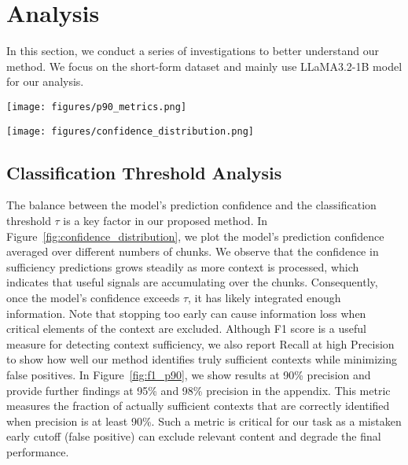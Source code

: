 \section{Analysis}
In this section, we conduct a series of investigations to better understand our method. We focus on the short-form dataset and mainly use LLaMA3.2-1B model for our analysis. 


\noindent\begin{minipage}[t]{0.48\textwidth}
\centering
\vspace{-2mm}
\texttt{[image: figures/p90\_metrics.png]}
\vspace{-2mm}
\vspace{-5em}
\label{fig:f1_p90}
\end{minipage}
\hfill
\begin{minipage}[t]{0.48\textwidth}
\centering

\centering
\vspace{-2mm}
\texttt{[image: figures/confidence\_distribution.png]}
\vspace{-2mm}
\label{fig:confidence_distribution}
\end{minipage}


\subsection{Classification Threshold Analysis}
\label{sec:threshold}
The balance between the model’s prediction confidence and the classification threshold $\tau$ is a key factor in our proposed method. In Figure~\ref{fig:confidence_distribution}, we plot the model’s prediction confidence averaged over different numbers of chunks. We observe that the confidence in sufficiency predictions grows steadily as more context is processed, which indicates that useful signals are accumulating over the chunks. Consequently, once the model’s confidence exceeds $\tau$, it has likely integrated enough information. Note that stopping too early can cause information loss when critical elements of the context are excluded. 
Although F1 score is a useful measure for detecting context sufficiency, we also report Recall at high Precision to show how well our method identifies truly sufficient contexts while minimizing false positives. In Figure~\ref{fig:f1_p90}, we show results at 90\% precision and provide further findings at 95\% and 98\% precision in the appendix. This metric measures the fraction of actually sufficient contexts that are correctly identified when precision is at least 90\%. Such a metric is critical for our task as a mistaken early cutoff (false positive) can exclude relevant content and degrade the final performance. 


